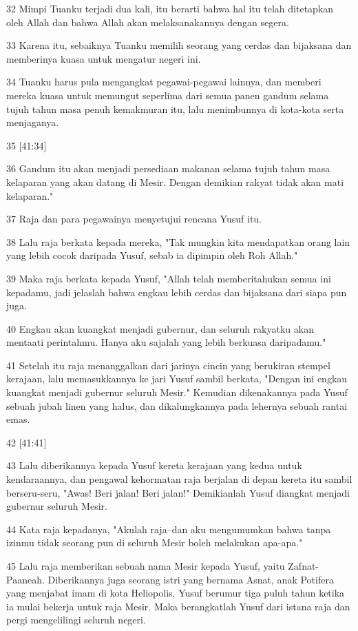 \par 32 Mimpi Tuanku terjadi dua kali, itu berarti bahwa hal itu telah ditetapkan oleh Allah dan bahwa Allah akan melaksanakannya dengan segera.
\par 33 Karena itu, sebaiknya Tuanku memilih seorang yang cerdas dan bijaksana dan memberinya kuasa untuk mengatur negeri ini.
\par 34 Tuanku harus pula mengangkat pegawai-pegawai lainnya, dan memberi mereka kuasa untuk memungut seperlima dari semua panen gandum selama tujuh tahun masa penuh kemakmuran itu, lalu menimbunnya di kota-kota serta menjaganya.
\par 35 [41:34]
\par 36 Gandum itu akan menjadi persediaan makanan selama tujuh tahun masa kelaparan yang akan datang di Mesir. Dengan demikian rakyat tidak akan mati kelaparan."
\par 37 Raja dan para pegawainya menyetujui rencana Yusuf itu.
\par 38 Lalu raja berkata kepada mereka, "Tak mungkin kita mendapatkan orang lain yang lebih cocok daripada Yusuf, sebab ia dipimpin oleh Roh Allah."
\par 39 Maka raja berkata kepada Yusuf, "Allah telah memberitahukan semua ini kepadamu, jadi jelaslah bahwa engkau lebih cerdas dan bijaksana dari siapa pun juga.
\par 40 Engkau akan kuangkat menjadi gubernur, dan seluruh rakyatku akan mentaati perintahmu. Hanya aku sajalah yang lebih berkuasa daripadamu."
\par 41 Setelah itu raja menanggalkan dari jarinya cincin yang berukiran stempel kerajaan, lalu memasukkannya ke jari Yusuf sambil berkata, "Dengan ini engkau kuangkat menjadi gubernur seluruh Mesir." Kemudian dikenakannya pada Yusuf sebuah jubah linen yang halus, dan dikalungkannya pada lehernya sebuah rantai emas.
\par 42 [41:41]
\par 43 Lalu diberikannya kepada Yusuf kereta kerajaan yang kedua untuk kendaraannya, dan pengawal kehormatan raja berjalan di depan kereta itu sambil berseru-seru, "Awas! Beri jalan! Beri jalan!" Demikianlah Yusuf diangkat menjadi gubernur seluruh Mesir.
\par 44 Kata raja kepadanya, "Akulah raja--dan aku mengumumkan bahwa tanpa izinmu tidak seorang pun di seluruh Mesir boleh melakukan apa-apa."
\par 45 Lalu raja memberikan sebuah nama Mesir kepada Yusuf, yaitu Zafnat-Paaneah. Diberikannya juga seorang istri yang bernama Asnat, anak Potifera yang menjabat imam di kota Heliopolis. Yusuf berumur tiga puluh tahun ketika ia mulai bekerja untuk raja Mesir. Maka berangkatlah Yusuf dari istana raja dan pergi mengelilingi seluruh negeri.
